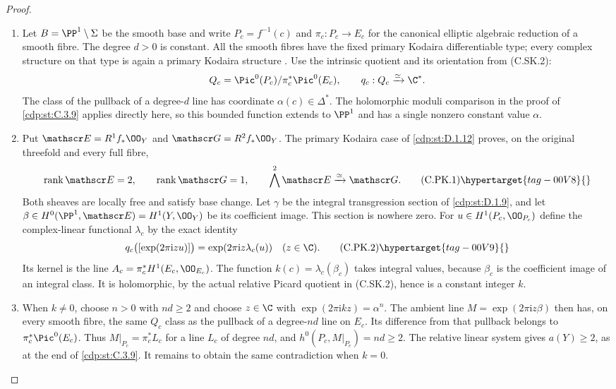 \begin{proof}

\begin{enumerate}[label={$\langle1\rangle$\arabic*.},leftmargin=*]
\item Let $B=\PP^1\setminus\Sigma$ be the smooth base and write
$P_c=f^{-1}(c)$ and $\pi_c:P_c\to E_c$ for the canonical
elliptic algebraic reduction of a smooth fibre. The degree
$d>0$ is constant. All the smooth fibres have the fixed
primary Kodaira differentiable type; every complex structure
on that type is again a primary Kodaira structure
\cite[pp.~373--374]{Borcea1984}.
Use the intrinsic quotient and its orientation from (C.SK.2):
\[
 Q_c=\Pic^0(P_c)/\pi_c^*\Pic^0(E_c),\qquad
 q_c:Q_c\xrightarrow{\simeq}\C^*.
\]
The class of the pullback of a degree-$d$ line has coordinate
$\alpha(c)\in\Delta^*$. The holomorphic moduli comparison
in the proof of \ref{cdp:st:C.3.9} applies directly here, so this bounded
function extends to $\PP^1$ and has a single nonzero
constant value $\alpha$.

\item Put $\mathscr E=R^1f_*\OO_Y$ and
$\mathscr G=R^2f_*\OO_Y$. The primary Kodaira case of
\ref{cdp:st:D.1.12} proves, on the original threefold and every full fibre,
\[
 \operatorname{rank}\mathscr E=2,\qquad
 \operatorname{rank}\mathscr G=1,\qquad
 \bigwedge^2\mathscr E\xrightarrow{\simeq}\mathscr G.
\tag{C.PK.1}\hypertarget{tag-00V8}{}\label{cdp:eq:C.PK.1}
\]
Both sheaves are locally free and satisfy base change.
Let $\gamma$ be the integral transgression section of \ref{cdp:st:D.1.9},
and let $\beta\in H^0(\PP^1,\mathscr E)=H^1(Y,\OO_Y)$
be its coefficient image. This section is nowhere zero.
For $u\in H^1(P_c,\OO_{P_c})$ define the complex-linear
functional $\lambda_c$ by the exact identity
\[
 q_c\bigl([\exp(2\pi\mathrm i z u)]\bigr)
     =\exp(2\pi\mathrm i z\lambda_c(u))
     \quad(z\in\C).
\tag{C.PK.2}\hypertarget{tag-00V9}{}\label{cdp:eq:C.PK.2}
\]
Its kernel is the line
$A_c=\pi_c^*H^1(E_c,\OO_{E_c})$.
The function $k(c)=\lambda_c(\beta_c)$ takes integral
values, because $\beta_c$ is the coefficient image of
an integral class. It is holomorphic, by the actual relative
Picard quotient in (C.SK.2), hence is a constant integer $k$.

\item When $k\ne0$, choose $n>0$ with $nd\ge2$ and choose
$z\in\C$ with $\exp(2\pi\mathrm i kz)=\alpha^n$.
The ambient line $M=\exp(2\pi\mathrm i z\beta)$ then
has, on every smooth fibre, the same $Q_c$ class as the
pullback of a degree-$nd$ line on $E_c$. Its difference
from that pullback belongs to $\pi_c^*\Pic^0(E_c)$.
Thus
$M|_{P_c}=\pi_c^*L_c$ for a line $L_c$ of degree $nd$,
and $h^0(P_c,M|_{P_c})=nd\ge2$. The relative linear
system gives $a(Y)\ge2$, as at the end of \ref{cdp:st:C.3.9}.
It remains to obtain the same contradiction when $k=0$.


\end{enumerate}
\end{proof}

